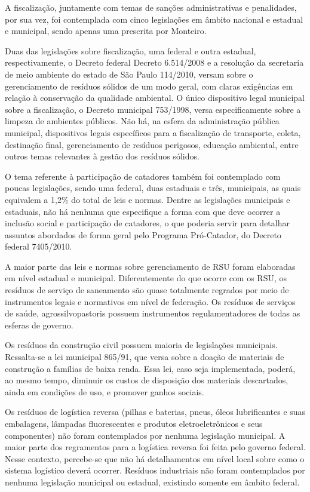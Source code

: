 	A fiscalização, juntamente com temas de sanções administrativas e penalidades, por sua vez, foi contemplada com cinco legislações em âmbito nacional e estadual e municipal, sendo apenas uma prescrita por Monteiro.
	
	Duas das legislações sobre fiscalização, uma federal e outra estadual, respectivamente, o Decreto federal Decreto 6.514/2008 e a resolução da secretaria de meio ambiente do estado de São Paulo 114/2010, versam sobre o gerenciamento de resíduos sólidos de um modo geral, com claras exigências em relação à conservação da qualidade ambiental. O único dispositivo legal municipal sobre a fiscalização, o Decreto municipal 753/1998, versa especificamente sobre a limpeza de ambientes públicos. Não há, na esfera da administração pública municipal, dispositivos legais específicos para a fiscalização de transporte, coleta, destinação final, gerenciamento de resíduos perigosos, educação ambiental, entre outros temas relevantes à gestão dos resíduos sólidos. 
	
	O tema referente à participação de catadores também foi contemplado com poucas legislações, sendo uma federal, duas estaduais e três, municipais, as quais equivalem a 1,2\% do total de leis e normas. Dentre as legislações municipais e estaduais, não há nenhuma que especifique a forma com que deve ocorrer a inclusão social e participação de catadores, o que poderia servir para detalhar assuntos abordados de forma geral pelo Programa Pró-Catador, do Decreto federal 7405/2010.
	
	A maior parte das leis e normas sobre gerenciamento de RSU foram elaboradas em nível estadual e municipal.  Diferentemente do que ocorre com os RSU, os resíduos de serviço de saneamento são quase totalmente regrados por meio de instrumentos legais e normativos em nível de federação. Os resíduos de serviços de saúde, agrossilvopastoris possuem instrumentos regulamentadores de todas as esferas de governo.
	
	Os resíduos da construção civil possuem maioria de legislações municipais. Ressalta-se a lei municipal 865/91, que versa sobre a doação de materiais de construção a famílias de baixa renda. Essa lei, caso seja implementada, poderá, ao mesmo tempo, diminuir os custos de disposição dos materiais descartados, ainda em condições de uso, e promover ganhos sociais.
	
	Os resíduos de logística reversa (pilhas e baterias, pneus, óleos lubrificantes e suas embalagens, lâmpadas fluorescentes e produtos eletroeletrônicos e seus componentes) não foram contemplados por nenhuma legislação municipal. A maior parte dos regramentos para a logística reversa foi feita pelo governo federal. Nesse contexto, percebe-se que não há detalhamentos em nível local sobre como o sistema logístico deverá ocorrer. Resíduos industriais não foram contemplados por nenhuma legislação municipal ou estadual, existindo somente em âmbito federal.
	
